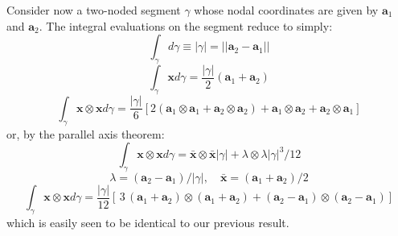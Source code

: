 \documentclass[11pt]{article} %
\begin{document}
Consider now a two-noded segment $\gamma$ whose nodal coordinates are given by $\mathbf{a}_1$ and $\mathbf{a}_2$. The integral evaluations on the segment reduce to simply:
\begin{equation}
	\int_{\gamma} d \gamma \equiv | \gamma | = || \mathbf{a}_{2} - \mathbf{a}_{1} ||
\end{equation}
\begin{equation}
	\int_{\gamma} \mathbf{x} d \gamma = \frac{| \gamma |}{2} (\mathbf{a}_{1} + \mathbf{a}_{2})
\end{equation}
\begin{equation}
	\int_{\gamma} \mathbf{x} \otimes \mathbf{x} d \gamma = \frac{| \gamma |}{6} \left[ 2 (\mathbf{a}_{1} \otimes \mathbf{a}_{1} + \mathbf{a}_{2} \otimes \mathbf{a}_{2}) + \mathbf{a}_{1} \otimes \mathbf{a}_{2} + \mathbf{a}_{2} \otimes \mathbf{a}_{1} \right]
\end{equation}
or, by the parallel axis theorem:
\begin{equation}
	\int_{\gamma} \mathbf{x} \otimes \mathbf{x} d \gamma = \bar{\mathbf{x}} \otimes \bar{\mathbf{x}} |\gamma| + \lambda \otimes \lambda |\gamma|^3/12
\end{equation}
\begin{equation}
	\lambda = (\mathbf{a}_{2} - \mathbf{a}_{1})/|\gamma|, \quad \bar{\mathbf{x}} = (\mathbf{a}_{1} + \mathbf{a}_{2})/2
\end{equation}
\begin{equation}
	\int_{\gamma} \mathbf{x} \otimes \mathbf{x} d \gamma = \frac{| \gamma |}{12} \left[ \, 3 \, (\mathbf{a}_{1} + \mathbf{a}_{2}) \otimes (\mathbf{a}_{1} + \mathbf{a}_{2}) + (\mathbf{a}_{2} - \mathbf{a}_{1}) \otimes (\mathbf{a}_{2} - \mathbf{a}_{1}) \right]
\end{equation}
which is easily seen to be identical to our previous result.
\end{document}
